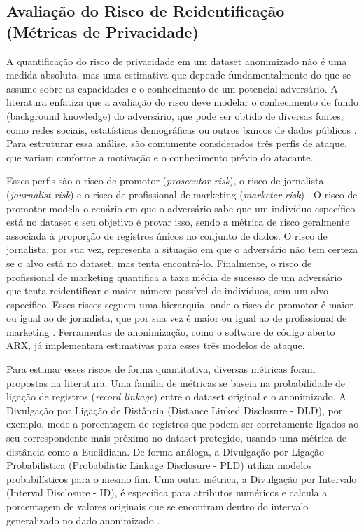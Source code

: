 \subsection{Avaliação do Risco de Reidentificação (Métricas de Privacidade)}
\label{subsec:fund-metricas-privacidade}

A quantificação do risco de privacidade em um dataset anonimizado não é uma medida absoluta, mas uma estimativa que depende fundamentalmente do que se assume sobre as capacidades e o conhecimento de um potencial adversário. A literatura enfatiza que a avaliação do risco deve modelar o conhecimento de fundo (background knowledge) do adversário, que pode ser obtido de diversas fontes, como redes sociais, estatísticas demográficas ou outros bancos de dados públicos \cite{Ferrao2022}. Para estruturar essa análise, são comumente considerados três perfis de ataque, que variam conforme a motivação e o conhecimento prévio do atacante.

Esses perfis são o risco de promotor (\textit{prosecutor risk}), o risco de jornalista (\textit{journalist risk}) e o risco de profissional de marketing (\textit{marketer risk}) \cite{Ferrao2022}. O risco de promotor modela o cenário em que o adversário sabe que um indivíduo específico está no dataset e seu objetivo é provar isso, sendo a métrica de risco geralmente associada à proporção de registros únicos no conjunto de dados. O risco de jornalista, por sua vez, representa a situação em que o adversário não tem certeza se o alvo está no dataset, mas tenta encontrá-lo. Finalmente, o risco de profissional de marketing quantifica a taxa média de sucesso de um adversário que tenta reidentificar o maior número possível de indivíduos, sem um alvo específico. Esses riscos seguem uma hierarquia, onde o risco de promotor é maior ou igual ao de jornalista, que por sua vez é maior ou igual ao de profissional de marketing \cite{Ferrao2022}. Ferramentas de anonimização, como o software de código aberto ARX, já implementam estimativas para esses três modelos de ataque.

Para estimar esses riscos de forma quantitativa, diversas métricas foram propostas na literatura. Uma família de métricas se baseia na probabilidade de ligação de registros (\textit{record linkage}) entre o dataset original e o anonimizado. A Divulgação por Ligação de Distância (Distance Linked Disclosure - DLD), por exemplo, mede a porcentagem de registros que podem ser corretamente ligados ao seu correspondente mais próximo no dataset protegido, usando uma métrica de distância como a Euclidiana. De forma análoga, a Divulgação por Ligação Probabilística (Probabilistic Linkage Disclosure - PLD) utiliza modelos probabilísticos para o mesmo fim. Uma outra métrica, a Divulgação por Intervalo (Interval Disclosure - ID), é específica para atributos numéricos e calcula a porcentagem de valores originais que se encontram dentro do intervalo generalizado no dado anonimizado \cite{Zuo2021Data}.

